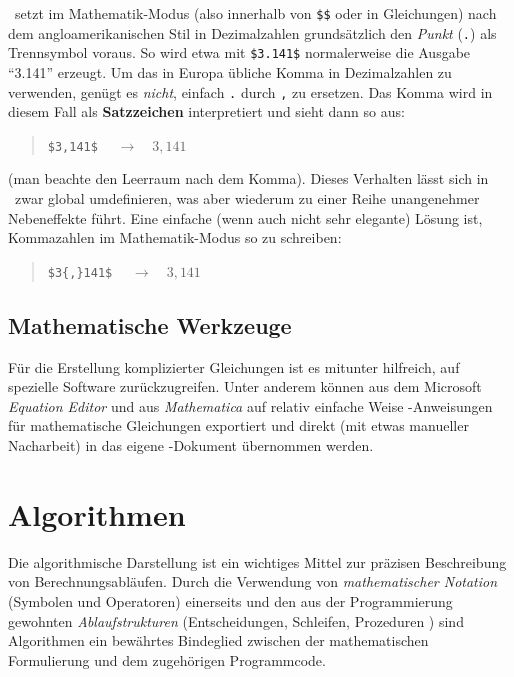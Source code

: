 \latex\ setzt im Mathematik-Modus (also innerhalb von \verb!$$! oder in Gleichungen) nach dem angloamerikanischen Stil in Dezimalzahlen grundsätzlich den \emph{Punkt} (\verb!.!) als Trennsymbol voraus. So wird etwa mit \verb!$3.141$! normalerweise die Ausgabe "`3.141"' erzeugt. Um das in Europa übliche Komma in Dezimalzahlen zu verwenden, genügt es \emph{nicht}, einfach \verb!.! durch \verb!,! zu ersetzen. Das Komma wird in diesem Fall
als \textbf{Satzzeichen} interpretiert und sieht dann so aus:
\begin{quote}
\verb!$3,141$!	$\quad \rightarrow \quad 3,141$ 
\end{quote}
(man beachte den Leerraum nach dem Komma). Dieses Verhalten lässt sich in \latex\ zwar global umdefinieren, was aber wiederum zu einer Reihe unangenehmer Nebeneffekte führt. Eine einfache (wenn auch nicht sehr elegante) Lösung ist, Kommazahlen im Mathematik-Modus so zu schreiben:
\begin{quote}
\verb!$3{,}141$!	$\quad \rightarrow \quad 3{,}141$
\end{quote}



\subsection{Mathematische Werkzeuge}

Für die Erstellung komplizierter Gleichungen ist es mitunter
hilfreich, auf spezielle Software zurückzugreifen. Unter anderem können
aus dem Microsoft \emph{Equation Editor} und aus {\em
Mathematica} auf relativ einfache Weise \latex-An\-wei\-sun\-gen
für mathematische Gleichungen exportiert und direkt (mit etwas
manueller Nacharbeit) in das eigene \latex-Dokument übernommen werden.


\section{Algorithmen}

Die algorithmische Darstellung ist ein wichtiges Mittel zur präzisen Beschreibung von 
Berechnungsabläufen. Durch die Verwendung von \emph{mathematischer Notation} (Symbolen und Operatoren) 
einerseits und den aus der Programmierung gewohnten \emph{Ablaufstrukturen} (Entscheidungen, Schleifen,
Prozeduren \etc) sind Algorithmen ein bewährtes Bindeglied zwischen der mathematischen Formulierung
und dem zugehörigen Programmcode.

